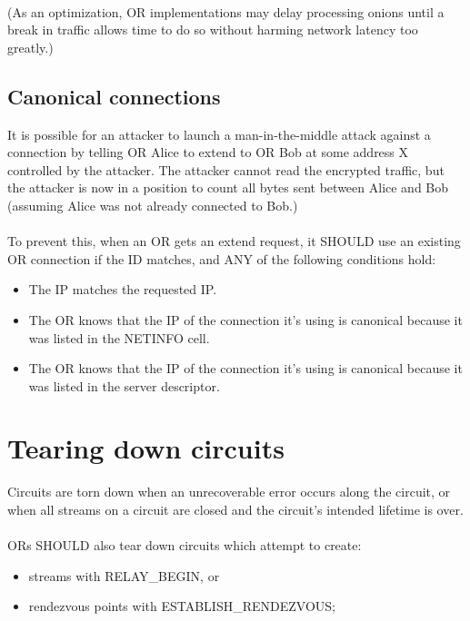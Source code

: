 \paragraph{}
(As an optimization, OR implementations may delay processing onions
until a break in traffic allows time to do so without harming
network latency too greatly.)


\subsection{Canonical connections}
It is possible for an attacker to launch a man-in-the-middle attack
against a connection by telling OR Alice to extend to OR Bob at some
address X controlled by the attacker. The attacker cannot read the
encrypted traffic, but the attacker is now in a position to count all
bytes sent between Alice and Bob (assuming Alice was not already
connected to Bob.)

\paragraph{}
To prevent this, when an OR gets an extend request, it SHOULD use an
existing OR connection if the ID matches, and ANY of the following
conditions hold:

\begin{itemize}
    \item The IP matches the requested IP.
    \item The OR knows that the IP of the connection it's using is canonical
    because it was listed in the NETINFO cell.
    \item The OR knows that the IP of the connection it's using is canonical
    because it was listed in the server descriptor.
\end{itemize}

\section{Tearing down circuits}
Circuits are torn down when an unrecoverable error occurs along
the circuit, or when all streams on a circuit are closed and the
circuit's intended lifetime is over.

\paragraph{}
ORs SHOULD also tear down circuits which attempt to create:

\begin{itemize}
    \item streams with RELAY\_BEGIN, or
    \item rendezvous points with ESTABLISH\_RENDEZVOUS;
\end{itemize}

